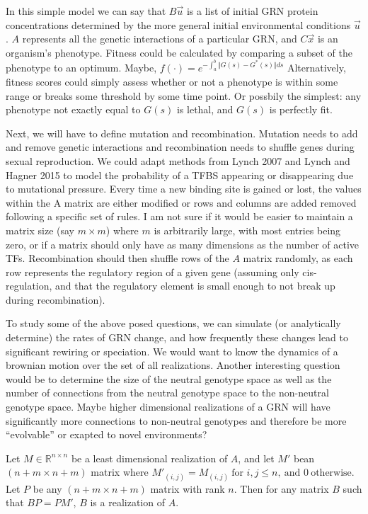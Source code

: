 \documentclass[11 pt]{article}
\begin{document}
In this simple model we can say that $B\vec{u}$ is a list of initial GRN
protein concentrations determined by the more general initial environmental
conditions $\vec{u}$. $A$ represents all the genetic interactions of a
particular GRN, and $C\vec{x}$ is an organism's phenotype. Fitness could be
calculated by comparing a subset of the phenotype to an optimum. Maybe,
$f(\cdot) = e^{- \int_{a}^{b} \Vert G(s) - G^{*}(s) \Vert ds}$ Alternatively,
fitness scores could simply assess whether or not a phenotype is within some
range or breaks some threshold by some time point. Or possbily the simplest:
any phenotype not exactly equal to $G(s)$ is lethal, and $G(s)$ is perfectly
fit. 

Next, we will have to define mutation and recombination. Mutation needs to add
and remove genetic interactions and recombination needs to shuffle genes during
sexual reproduction. We could adapt methods from Lynch 2007 and Lynch and
Hagner 2015 to model the probability of a TFBS appearing or disappearing due to
mutational pressure. Every time a new binding site is gained or lost, the
values within the A matrix are either modified or rows and columns are added
removed following a specific set of rules. I am not sure if it would be easier
to maintain a matrix size (say $m \times m$) where $m$ is arbitrarily large,
with  most entries being zero, or if a matrix should only have as many
dimensions as the number of active TFs. Recombination should then shuffle rows
of the $A$ matrix randomly, as each row represents the regulatory region of a
given gene (assuming only cis-regulation, and that the regulatory element is
small enough to not break up during recombination).  

To study some of the above posed questions, we can simulate (or analytically
determine) the rates of GRN change, and how frequently these changes lead to
significant rewiring or speciation. We would want to know the dynamics of a
brownian motion over the set of all realizations.  Another interesting question
would be to determine the size of the neutral genotype space as well as the
number of connections from the neutral genotype space to the non-neutral
genotype space. Maybe higher dimensional realizations of a GRN will have
significantly more connections to non-neutral genotypes and therefore be more
``evolvable'' or exapted to novel environments? 

Let $M \in \mathbb{R}^{n \times n}$ be a least dimensional realization of $A$,
and let $M'$ bean $(n+m \times n+m)$ matrix where $M'_{(i,j)} = M_{(i,j)} \
\text{for } i,j \leq n, \ \text{and } 0 \ \text{otherwise}$. Let $P$ be any
$(n+m \times n+m)$ matrix with rank $n$. Then for any matrix $B$ such that $BP
= PM'$, $B$ is a realization of $A$.     
\end{document}
